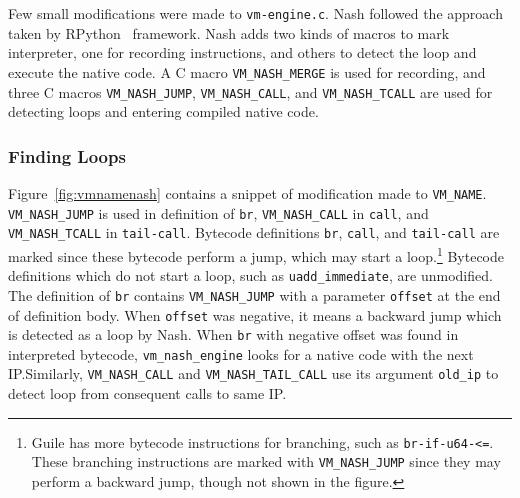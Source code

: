 \documentclass[preprint, 10pt]{sigplanconf}
\begin{document}
Few small modifications were made to \texttt{vm-engine.c}. Nash followed the
approach taken by RPython~\cite{bolz2009tracing} framework. Nash adds two kinds
of macros to mark interpreter, one for recording instructions, and others to
detect the loop and execute the native code. A C macro \texttt{VM\_NASH\_MERGE}
is used for recording, and three C macros \texttt{VM\_NASH\_JUMP},
\texttt{VM\_NASH\_CALL}, and \texttt{VM\_NASH\_TCALL} are used for detecting
loops and entering compiled native code.

\subsubsection{Finding Loops}

Figure~\hyperref[fig:vmnamenash]{\ref{fig:vmnamenash}} contains a snippet of
modification made to \texttt{VM\_NAME}. \texttt{VM\_NASH\_JUMP} is used in
definition of \texttt{br}, \texttt{VM\_NASH\_CALL} in \texttt{call}, and
\texttt{VM\_NASH\_TCALL} in \texttt{tail-call}. Bytecode definitions
\texttt{br}, \texttt{call}, and \texttt{tail-call} are marked since these
bytecode perform a jump, which may start a loop.\footnote{Guile has more
  bytecode instructions for branching, such as \texttt{br-if-u64-<=}. These
  branching instructions are marked with \texttt{VM\_NASH\_JUMP} since they may
  perform a backward jump, though not shown in the figure.}  Bytecode
definitions which do not start a loop, such as \texttt{uadd\_immediate}, are
unmodified. The definition of \texttt{br} contains \texttt{VM\_NASH\_JUMP} with
a parameter \texttt{offset} at the end of definition body. When \texttt{offset}
was negative, it means a backward jump which is detected as a loop by Nash. When
\texttt{br} with negative offset was found in interpreted bytecode,
\texttt{vm\_nash\_engine} looks for a native code with the next IP.\@ Similarly,
\texttt{VM\_NASH\_CALL} and \texttt{VM\_NASH\_TAIL\_CALL} use its argument
\texttt{old\_ip} to detect loop from consequent calls to same IP.\@

\end{document}
